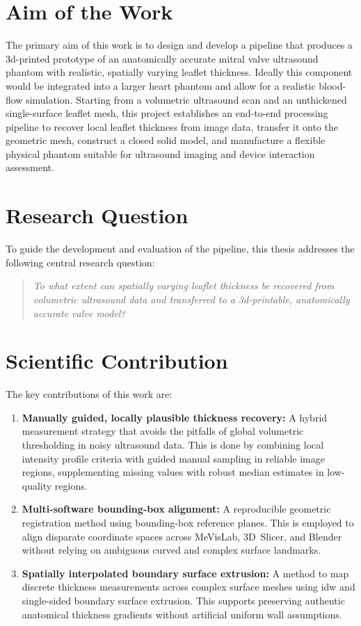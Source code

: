 \section{Aim of the Work}\label{sec:intro_aim}

The primary aim of this work is to design and develop a pipeline that produces a \gls{3d}-printed prototype of an anatomically accurate mitral valve ultrasound phantom with realistic, spatially varying leaflet thickness. Ideally this component would be integrated into a larger heart phantom and allow for a realistic blood-flow simulation. Starting from a volumetric ultrasound scan and an unthickened single-surface leaflet mesh, this project establishes an end-to-end processing pipeline to recover local leaflet thickness from image data, transfer it onto the geometric mesh, construct a closed solid model, and manufacture a flexible physical phantom suitable for ultrasound imaging and device interaction assessment.

\section{Research Question}\label{sec:intro_rq}

To guide the development and evaluation of the pipeline, this thesis addresses the following central research question:

\begin{quote}
\emph{To what extent can spatially varying leaflet thickness be recovered from volumetric ultrasound data and transferred to a \gls{3d}-printable, anatomically accurate valve model?}
\end{quote}

\section{Scientific Contribution}\label{sec:intro_contribution}

The key contributions of this work are:

\begin{enumerate}
    \item \textbf{Manually guided, locally plausible thickness recovery:} A hybrid measurement strategy that avoids the pitfalls of global volumetric thresholding in noisy ultrasound data. This is done by combining local intensity profile criteria with guided manual sampling in reliable image regions, supplementing missing values with robust median estimates in low-quality regions.
    \item \textbf{Multi-software bounding-box alignment:} A reproducible geometric registration method using bounding-box reference planes. This is employed to align disparate coordinate spaces across MeVisLab, 3D~Slicer, and Blender without relying on ambiguous curved and complex surface landmarks.
    \item \textbf{Spatially interpolated boundary surface extrusion:} A method to map discrete thickness measurements across complex surface meshes using \gls{idw} and single-sided boundary surface extrusion. This supports preserving authentic anatomical thickness gradients without artificial uniform wall assumptions.
\end{enumerate}